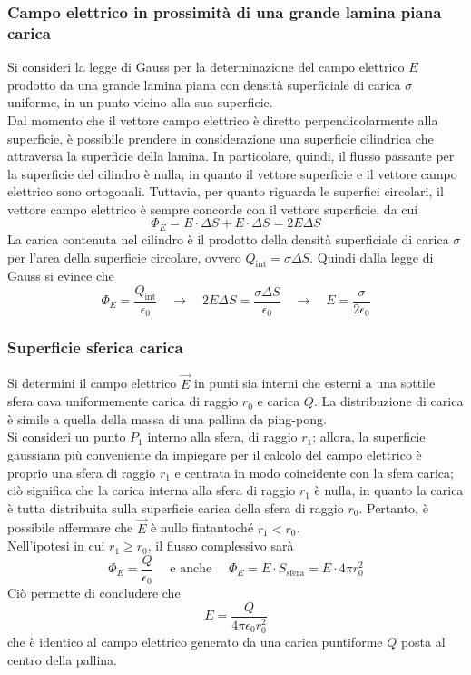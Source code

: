 \documentclass[a4paper]{extarticle}
\begin{document}
\vspace{1em}
\noindent
\subsubsection{Campo elettrico in prossimità di una grande lamina piana carica}
Si consideri la legge di Gauss per la determinazione del campo elettrico $E$ prodotto da una grande lamina piana con densità superficiale di carica $\sigma$ uniforme, in un punto vicino alla sua superficie.\\
Dal momento che il vettore campo elettrico è diretto perpendicolarmente alla superficie, è possibile prendere in considerazione una superficie cilindrica che attraversa la superficie della lamina. In particolare, quindi, il flusso passante per la superficie del cilindro è nulla, in quanto il vettore superficie e il vettore campo elettrico sono ortogonali. Tuttavia, per quanto riguarda le superfici circolari, il vettore campo elettrico è sempre concorde con il vettore superficie, da cui
\[\Phi_E = E \cdot \Delta S + E \cdot \Delta S = 2 E \Delta S\]
La carica contenuta nel cilindro è il prodotto della densità superficiale di carica $\sigma$ per l'area della superficie circolare, ovvero $Q_\text{int} = \sigma \Delta S$. Quindi dalla legge di Gauss si evince che
\[\Phi_E = \frac{Q_\text{int}}{\epsilon_0} \hspace{1em} \rightarrow \hspace{1em} 2 E \Delta S = \frac{\sigma \Delta S}{\epsilon_0} \hspace{1em} \rightarrow \hspace{1em} E = \frac{\sigma}{2 \epsilon_0}\]

\vspace{1em}
\noindent
\subsubsection{Superficie sferica carica}
Si determini il campo elettrico $\vec E$ in punti sia interni che esterni a una sottile sfera cava uniformemente carica di raggio $r_0$ e carica $Q$. La distribuzione di carica è simile a quella della massa di una pallina da ping-pong.\\
Si consideri un punto $P_1$ interno alla sfera, di raggio $r_1$; allora, la superficie gaussiana più conveniente da impiegare per il calcolo del campo elettrico è proprio una sfera di raggio $r_1$ e centrata in modo coincidente con la sfera carica; ciò significa che la carica interna alla sfera di raggio $r_1$ è nulla, in quanto la carica è tutta distribuita sulla superficie carica della sfera di raggio $r_0$. Pertanto, è possibile affermare che $\vec E$ è nullo fintantoché $r_1 < r_0$.\\
Nell'ipotesi in cui $r_1 \geq r_0$, il flusso complessivo sarà
\[\Phi_E = \frac{Q}{\epsilon_0} \hspace{1em} \text{ e anche } \hspace{1em} \Phi_E = E \cdot S_\text{sfera} = E \cdot 4 \pi r_0^2\]
Ciò permette di concludere che
\[E = \frac{Q}{4 \pi \epsilon_0 r_0^2}\]
che è identico al campo elettrico generato da una carica puntiforme $Q$ posta al centro della pallina.
\end{document}
